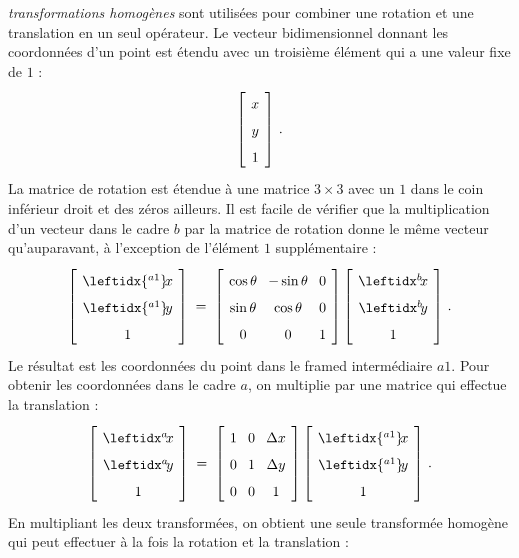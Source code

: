 \emph{transformations homogènes} sont utilisées pour combiner une rotation et une translation en un seul opérateur. Le vecteur bidimensionnel donnant les coordonnées d'un point est étendu avec un troisième élément qui a une valeur fixe de $1$ :
\[
\spacearray
\left[\begin{array}{c}x\\y\\1\end{array}\right]\,.
\]
La matrice de rotation est étendue à une matrice $3 \times 3$ avec un $1$ dans le coin inférieur droit et des zéros ailleurs. Il est facile de vérifier que la multiplication d'un vecteur dans le cadre $b$ par la matrice de rotation donne le même vecteur qu'auparavant, à l'exception de l'élément $1$ supplémentaire :
\[
\spacearray
\left[\begin{array}{c}\leftidx{^{a1}}\!{x}{}\\\leftidx{^{a1}}\!{y}{}\\1\end{array}\right]\;=\;
\left[\begin{array}{ccc}\cos\theta&-\sin\theta&0\\\sin\theta&\cos\theta&0\\0&0&1\end{array}\right]
\left[\begin{array}{c}\bx\\\by\\1\end{array}\right]\,.
\]
Le résultat est les coordonnées du point dans le framed intermédiaire $a1$. Pour obtenir les coordonnées dans le cadre $a$, on multiplie par une matrice qui effectue la translation :
\[
\spacearray
\left[\begin{array}{c}\ax\\\ay\\1\end{array}\right]\;=\;
\left[\begin{array}{ccc}1&0&\Delta x\\0&1&\Delta y\\0&0&1\end{array}\right]
\left[\begin{array}{c}\leftidx{^{a1}}\!{x}{}\\\leftidx{^{a1}}\!{y}{}\\1\end{array}\right]\,.
\]
En multipliant les deux transformées, on obtient une seule transformée homogène qui peut effectuer à la fois la rotation et la translation :
